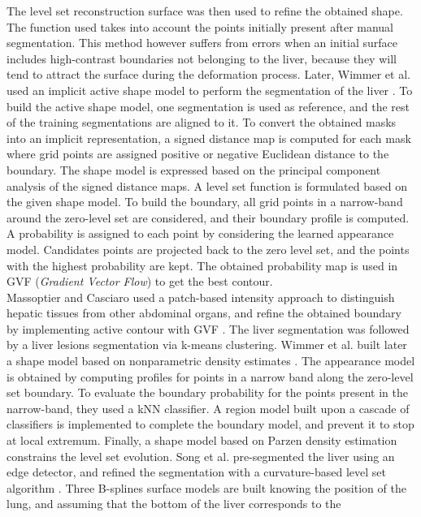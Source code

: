 \documentclass[]{article}
\begin{document}
The level set reconstruction surface was then used to refine the
obtained shape. The function used takes into account the points
initially present after manual segmentation. This method however suffers
from errors when an initial surface includes high-contrast boundaries
not belonging to the liver, because they will tend to attract the
surface during the deformation process. Later, Wimmer et al. used an implicit active shape model to perform the
segmentation of the liver \cite{Wimmer2008}. To build the active shape model, one
segmentation is used as reference, and the rest of the training
segmentations are aligned to it. To convert the obtained masks into an
implicit representation, a signed distance map is computed for each mask
where grid points are assigned positive or negative Euclidean distance
to the boundary. The shape model is expressed based on the principal
component analysis of the signed distance maps. A level set function is
formulated based on the given shape model. To build the boundary, all
grid points in a narrow-band around the zero-level set are considered,
and their boundary profile is computed. A probability is assigned to
each point by considering the learned appearance model. Candidates
points are projected back to the zero level set, and the points with the
highest probability are kept. The obtained probability map is used in
GVF (\emph{Gradient Vector Flow}) to get the best contour.\\
Massoptier and Casciaro used a patch-based intensity approach to distinguish
hepatic tissues from other abdominal organs, and refine the obtained
boundary by implementing active contour with GVF \cite{Massoptier2008}. The liver segmentation
was followed by a liver lesions segmentation via k-means clustering. Wimmer et al. built later a shape model based on nonparametric density
estimates \cite{Wimmer2009}. The appearance model is obtained by computing profiles for
points in a narrow band along the zero-level set boundary. To evaluate
the boundary probability for the points present in the narrow-band, they
used a kNN classifier. A region model built upon a cascade of
classifiers is implemented to complete the boundary model, and prevent
it to stop at local extremum. Finally, a shape model based on Parzen
density estimation constrains the level set evolution. Song et al. pre-segmented the liver using an edge detector, and
refined the segmentation with a curvature-based level set algorithm \cite{Song2009}.
Three B-splines surface models are built knowing the position of the
lung, and assuming that the bottom of the liver corresponds to the
\end{document}
